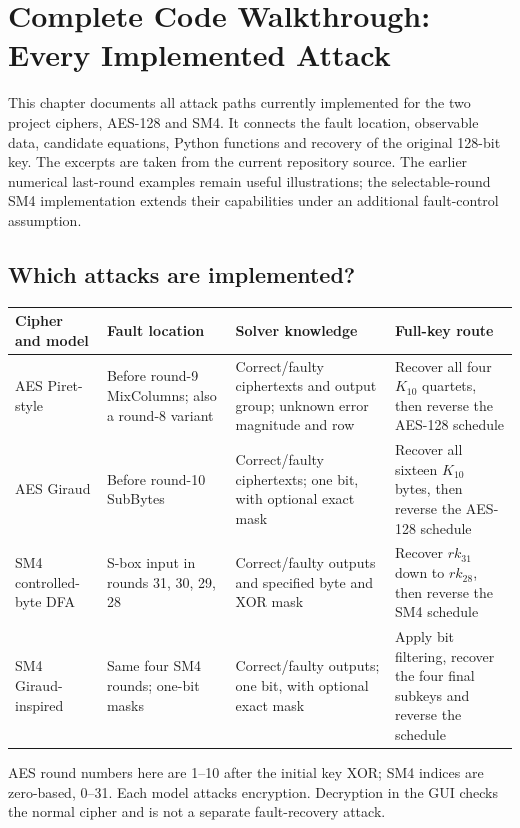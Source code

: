 \chapter{Complete Code Walkthrough: Every Implemented Attack}
\label{chap:all-attacks-code}
This chapter documents all attack paths currently implemented for the two project ciphers, AES-128 and SM4. It connects the fault location, observable data, candidate equations, Python functions and recovery of the original 128-bit key. The excerpts are taken from the current repository source. The earlier numerical last-round examples remain useful illustrations; the selectable-round SM4 implementation extends their capabilities under an additional fault-control assumption.

\section{Which attacks are implemented?}
\begin{center}
\small
\begin{tabular}{P{.15\linewidth}P{.23\linewidth}P{.26\linewidth}P{.25\linewidth}}
\toprule
Cipher and model & Fault location & Solver knowledge & Full-key route\\\midrule
AES Piret-style & Before round-9 MixColumns; also a round-8 variant & Correct/faulty ciphertexts and output group; unknown error magnitude and row & Recover all four $K_{10}$ quartets, then reverse the AES-128 schedule\\[2mm]
AES Giraud & Before round-10 SubBytes & Correct/faulty ciphertexts; one bit, with optional exact mask & Recover all sixteen $K_{10}$ bytes, then reverse the AES-128 schedule\\[2mm]
SM4 controlled-byte DFA & S-box input in rounds 31, 30, 29, 28 & Correct/faulty outputs and specified byte and XOR mask & Recover $rk_{31}$ down to $rk_{28}$, then reverse the SM4 schedule\\[2mm]
SM4 Giraud-inspired & Same four SM4 rounds; one-bit masks & Correct/faulty outputs; one bit, with optional exact mask & Apply bit filtering, recover the four final subkeys and reverse the schedule\\
\bottomrule
\end{tabular}
\end{center}
AES round numbers here are 1--10 after the initial key XOR; SM4 indices are zero-based, 0--31. Each model attacks encryption. Decryption in the GUI checks the normal cipher and is not a separate fault-recovery attack.

